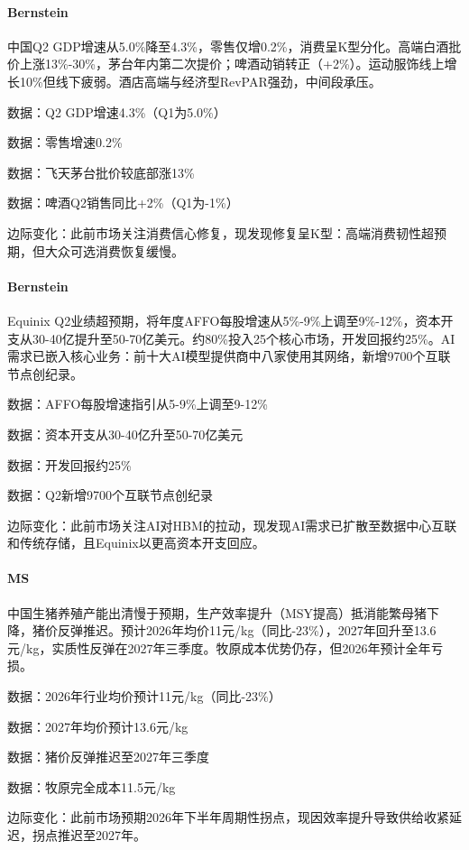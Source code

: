 \documentclass[11pt]{ctexart}
\begin{document}
\paragraph{Bernstein} 中国Q2 GDP增速从5.0\%降至4.3\%，零售仅增0.2\%，消费呈K型分化。高端白酒批价上涨13\%-30\%，茅台年内第二次提价；啤酒动销转正（+2\%）。运动服饰线上增长10\%但线下疲弱。酒店高端与经济型RevPAR强劲，中间段承压。
{\small\color{refgray}数据：Q2 GDP增速4.3\%（Q1为5.0\%）\par}
{\small\color{refgray}数据：零售增速0.2\%\par}
{\small\color{refgray}数据：飞天茅台批价较底部涨13\%\par}
{\small\color{refgray}数据：啤酒Q2销售同比+2\%（Q1为-1\%）\par}
{\small\color{refgray}边际变化：此前市场关注消费信心修复，现发现修复呈K型：高端消费韧性超预期，但大众可选消费恢复缓慢。\par}
\paragraph{Bernstein} Equinix Q2业绩超预期，将年度AFFO每股增速从5\%-9\%上调至9\%-12\%，资本开支从30-40亿提升至50-70亿美元。约80\%投入25个核心市场，开发回报约25\%。AI需求已嵌入核心业务：前十大AI模型提供商中八家使用其网络，新增9700个互联节点创纪录。
{\small\color{refgray}数据：AFFO每股增速指引从5-9\%上调至9-12\%\par}
{\small\color{refgray}数据：资本开支从30-40亿升至50-70亿美元\par}
{\small\color{refgray}数据：开发回报约25\%\par}
{\small\color{refgray}数据：Q2新增9700个互联节点创纪录\par}
{\small\color{refgray}边际变化：此前市场关注AI对HBM的拉动，现发现AI需求已扩散至数据中心互联和传统存储，且Equinix以更高资本开支回应。\par}
\paragraph{MS} 中国生猪养殖产能出清慢于预期，生产效率提升（MSY提高）抵消能繁母猪下降，猪价反弹推迟。预计2026年均价11元/kg（同比-23\%），2027年回升至13.6元/kg，实质性反弹在2027年三季度。牧原成本优势仍存，但2026年预计全年亏损。
{\small\color{refgray}数据：2026年行业均价预计11元/kg（同比-23\%）\par}
{\small\color{refgray}数据：2027年均价预计13.6元/kg\par}
{\small\color{refgray}数据：猪价反弹推迟至2027年三季度\par}
{\small\color{refgray}数据：牧原完全成本11.5元/kg\par}
{\small\color{refgray}边际变化：此前市场预期2026年下半年周期性拐点，现因效率提升导致供给收紧延迟，拐点推迟至2027年。\par}
\end{document}

